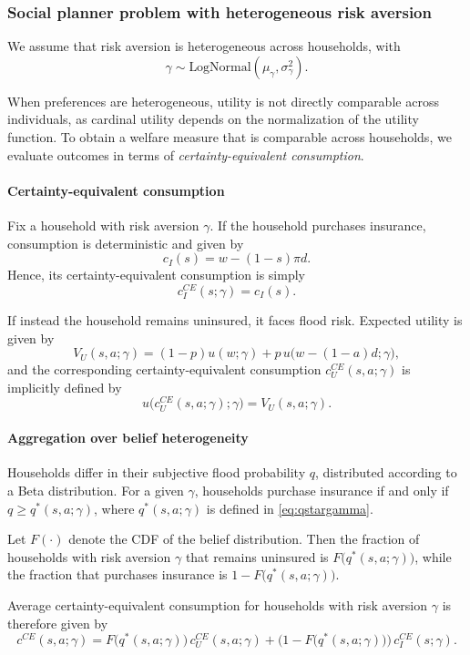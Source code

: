 \documentclass[12pt]{article}
\begin{document}
\subsubsection{Social planner problem with heterogeneous risk aversion}

We assume that risk aversion is heterogeneous across households, with
\[
\gamma \sim \text{LogNormal}(\mu_\gamma, \sigma_\gamma^2).
\]

When preferences are heterogeneous, utility is not directly comparable across individuals, as cardinal utility depends on the normalization of the utility function. To obtain a welfare measure that is comparable across households, we evaluate outcomes in terms of \emph{certainty-equivalent consumption}.

\paragraph{Certainty-equivalent consumption}

Fix a household with risk aversion $\gamma$. If the household purchases insurance, consumption is deterministic and given by
\[
c_I(s) = w - (1-s)\pi d.
\]
Hence, its certainty-equivalent consumption is simply
\[
c_I^{CE}(s;\gamma) = c_I(s).
\]

If instead the household remains uninsured, it faces flood risk. Expected utility is given by
\[
V_U(s,a;\gamma) = (1-p)u(w;\gamma) + p\,u\bigl(w-(1-a)d;\gamma\bigr),
\]
and the corresponding certainty-equivalent consumption $c_U^{CE}(s,a;\gamma)$ is implicitly defined by
\[
u\bigl(c_U^{CE}(s,a;\gamma);\gamma\bigr) = V_U(s,a;\gamma).
\]

\paragraph{Aggregation over belief heterogeneity}

Households differ in their subjective flood probability $q$, distributed according to a Beta distribution. For a given $\gamma$, households purchase insurance if and only if $q \geq q^*(s,a;\gamma)$, where $q^*(s,a;\gamma)$ is defined in \eqref{eq:qstargamma}. 

Let $F(\cdot)$ denote the CDF of the belief distribution. Then the fraction of households with risk aversion $\gamma$ that remains uninsured is $F\bigl(q^*(s,a;\gamma)\bigr)$, while the fraction that purchases insurance is $1 - F\bigl(q^*(s,a;\gamma)\bigr)$.

Average certainty-equivalent consumption for households with risk aversion $\gamma$ is therefore given by
\[
c^{CE}(s,a;\gamma)
=
F\bigl(q^*(s,a;\gamma)\bigr)\, c_U^{CE}(s,a;\gamma)
+
\bigl(1 - F\bigl(q^*(s,a;\gamma)\bigr)\bigr)\, c_I^{CE}(s;\gamma).
\]
\end{document}
